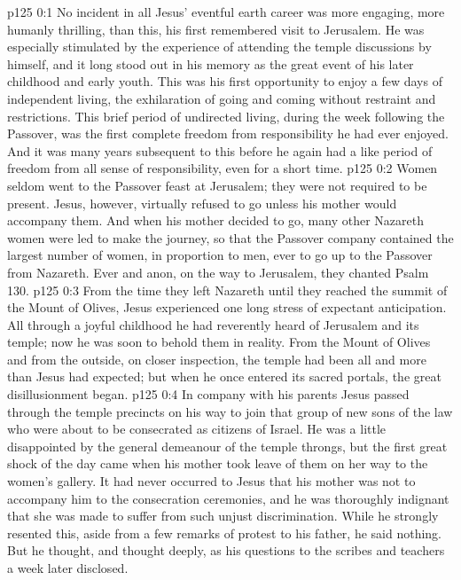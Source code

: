 \author{Midwayer Commission}
\vs p125 0:1 No incident in all Jesus’ eventful earth career was more engaging, more humanly thrilling, than this, his first remembered visit to Jerusalem. He was especially stimulated by the experience of attending the temple discussions by himself, and it long stood out in his memory as the great event of his later childhood and early youth. This was his first opportunity to enjoy a few days of independent living, the exhilaration of going and coming without restraint and restrictions. This brief period of undirected living, during the week following the Passover, was the first complete freedom from responsibility he had ever enjoyed. And it was many years subsequent to this before he again had a like period of freedom from all sense of responsibility, even for a short time.
\vs p125 0:2 \pc Women seldom went to the Passover feast at Jerusalem; they were not required to be present. Jesus, however, virtually refused to go unless his mother would accompany them. And when his mother decided to go, many other Nazareth women were led to make the journey, so that the Passover company contained the largest number of women, in proportion to men, ever to go up to the Passover from Nazareth. Ever and anon, on the way to Jerusalem, they chanted Psalm 130.
\vs p125 0:3 From the time they left Nazareth until they reached the summit of the Mount of Olives, Jesus experienced one long stress of expectant anticipation. All through a joyful childhood he had reverently heard of Jerusalem and its temple; now he was soon to behold them in reality. From the Mount of Olives and from the outside, on closer inspection, the temple had been all and more than Jesus had expected; but when he once entered its sacred portals, the great disillusionment began.
\vs p125 0:4 In company with his parents Jesus passed through the temple precincts on his way to join that group of new sons of the law who were about to be consecrated as citizens of Israel. He was a little disappointed by the general demeanour of the temple throngs, but the first great shock of the day came when his mother took leave of them on her way to the women’s gallery. It had never occurred to Jesus that his mother was not to accompany him to the consecration ceremonies, and he was thoroughly indignant that she was made to suffer from such unjust discrimination. While he strongly resented this, aside from a few remarks of protest to his father, he said nothing. But he thought, and thought deeply, as his questions to the scribes and teachers a week later disclosed.
